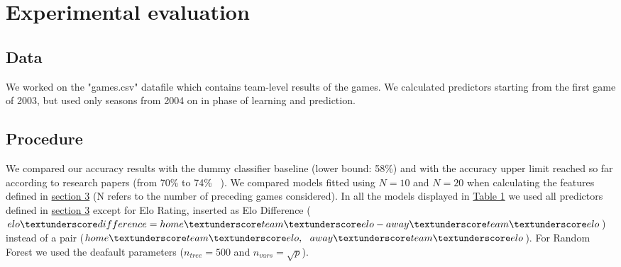\documentclass{article}
\begin{document}
\section{Experimental evaluation}
\label{sec:ExpEva}
\subsection{Data}
We worked on the "games.csv" datafile which contains team-level results of the games. We calculated predictors starting from the first game of 2003, but used only seasons from 2004 on in phase of learning and prediction.

\subsection{Procedure}
We compared our accuracy results with the dummy classifier baseline (lower bound: 58\%) and with the accuracy upper limit reached so far according to research papers (from 70\% to 74\%  ~\cite{Perricone2016PredictingRF}).  We compared models fitted using $N=10$ and $N=20$ when calculating the features defined in \hyperref[sec:Proposedsol]{section 3} (N refers to the number of preceding games considered).  In all the models displayed in \hyperref[tab:Tab1]{Table 1} we used all predictors defined in \hyperref[sec:Proposedsol]{section 3} except for Elo Rating, inserted as Elo Difference ($elo\textunderscore difference = home\textunderscore team\textunderscore elo - away\textunderscore team \textunderscore elo$) instead of a pair ($home\textunderscore team\textunderscore elo,\ \ away\textunderscore team \textunderscore elo$). For Random Forest we used the deafault parameters ($n_{tree} = 500$ and $n_{vars} = \sqrt{p}$).
\end{document}
